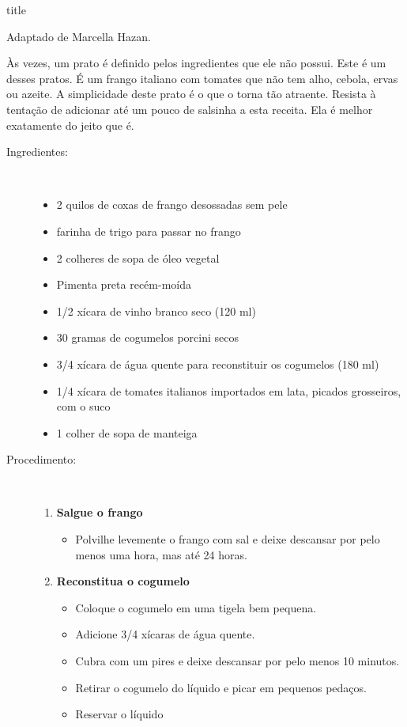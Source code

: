 \documentclass [11pt, letterpaper] {article}
\begin{document}
 {title}
\begin {flushright}
{\hspace {4in} Adaptado de Marcella Hazan.}
\end {flushright}
\vspace {0.5in}


Às vezes, um prato é definido pelos ingredientes que ele não possui. Este é um desses pratos. É um frango italiano com tomates que não tem alho, cebola, ervas ou azeite. A simplicidade deste prato é o que o torna tão atraente. Resista à tentação de adicionar at\'e um pouco de salsinha a esta receita. Ela \'e melhor exatamente do jeito que \'e.

\begin {description}

\item [Ingredientes:] \ \\
\begin {itemize}
\item 2 quilos de coxas de frango desossadas sem pele
\item farinha de trigo para passar no frango
\item 2 colheres de sopa de óleo vegetal
\item Pimenta preta recém-moída
\item 1/2 xícara de vinho branco seco (120 ml)
\item 30 gramas de cogumelos porcini secos
\item 3/4 xícara de \'agua quente para reconstituir os cogumelos (180 ml)
\item 1/4 xícara de tomates italianos importados em lata, picados grosseiros, com o suco
\item 1 colher de sopa de manteiga
\end {itemize}

\item [Procedimento:] \ \\

\begin {enumerate}

\item {\bf Salgue o frango}
\begin {itemize}
\item Polvilhe levemente o frango com sal e deixe descansar por pelo menos uma hora, mas até 24 horas.
\end {itemize}

\item {\bf Reconstitua o cogumelo}
\begin {itemize}
\item Coloque o cogumelo em uma tigela bem pequena.
\item Adicione 3/4 xícaras de água quente.
\item Cubra com um pires e deixe descansar por pelo menos 10 minutos.
\item Retirar o cogumelo do líquido e picar em pequenos pedaços.
\item Reservar o líquido
\end {itemize}


\end{enumerate}
\end{description}
\end{document}
